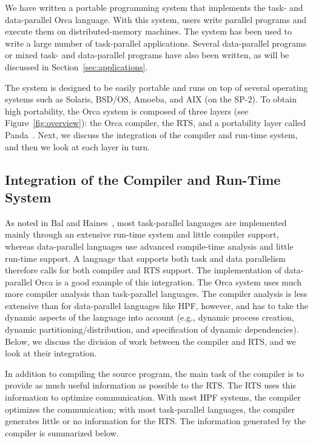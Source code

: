 \documentclass{acmtrans2e}
\begin{document}
We have written a portable programming system that implements the task-
and data-parallel Orca language. With this system, users write
parallel programs and execute them on distributed-memory machines. The
system has been used to write a large number of task-parallel
applications. Several data-parallel programs or mixed task- and data-parallel
programs have also been written,
as will be discussed in Section~\ref{sec:applications}.

The system is designed to be easily portable and runs on top of
several operating systems such as Solaris, BSD/OS, Amoeba, and AIX (on the
SP-2).
To obtain high portability, the Orca system is composed of
three layers (see Figure~\ref{fig:overview}): the Orca compiler, the
RTS, and a portability layer called Panda~\cite{ruhl96}.
Next, we discuss
the integration of the compiler and run-time system, and then we look at
each layer in turn.


\subsection{Integration of the Compiler and Run-Time System}

As noted in Bal and Haines~\citeyear{bal98},
most task-parallel languages
are implemented mainly through an extensive run-time system and
little compiler support, whereas data-parallel languages use
advanced compile-time analysis and little run-time support.
A language that supports both task and data parallelism therefore
calls for both compiler and RTS support.
The implementation of data-parallel Orca is a good example
of this integration.
The Orca system uses much more compiler analysis than task-parallel languages.
The compiler analysis is less extensive than for data-parallel
languages like HPF, however, and has to take the dynamic aspects
of the language into account (e.g., dynamic process creation,
dynamic partitioning/distribution, and
specification of dynamic dependencies).
Below, we discuss the division of work between the compiler and RTS,
and we look at their integration.

In addition to compiling the source program, the main task of the
compiler is to provide as much useful information as possible to the RTS.
The RTS uses this information
to optimize communication. With most
HPF systems, the compiler optimizes the communication; with most
task-parallel languages, the compiler generates little or no information
for the RTS.
The information generated by the compiler is summarized below.
\end{document}
